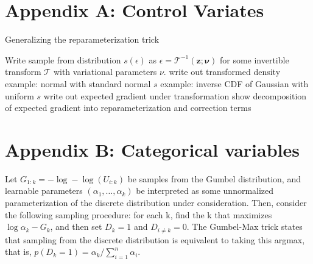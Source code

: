 \documentclass{article}
\begin{document}
\section{Appendix A: Control Variates}




\par{Generalizing the reparameterization trick}

Write sample from distribution $s(\epsilon)$ as $\epsilon = \mathcal{T}^{-1}(\mathbf{z}; \mathbf{\nu})$ for some invertible transform $\mathcal{T}$ with variational parameters $\nu$.
write out transformed density
example: normal with standard normal $s$
example: inverse CDF of Gaussian with uniform $s$
write out expected gradient under transformation
show decomposition of expected gradient into reparameterization and correction terms 






\section{Appendix B: Categorical variables}

Let $G_{1:k} = -\log-\log(U_{i:k})$ be samples from the Gumbel distribution, and learnable parameters $(\alpha_1, \dots, \alpha_k)$ be interpreted as some unnormalized parameterization of the discrete distribution under consideration.
Then, consider the following sampling procedure: for each k, find the k that maximizes $\log \alpha_k - G_k$, and then set $D_k=1$ and $D_{i \neq k} = 0$. The Gumbel-Max trick states that sampling from the discrete distribution is equivalent to taking this argmax, that is, $p(D_k = 1) = \alpha_k / \sum_{i=1}^n \alpha_i$.
\end{document}
